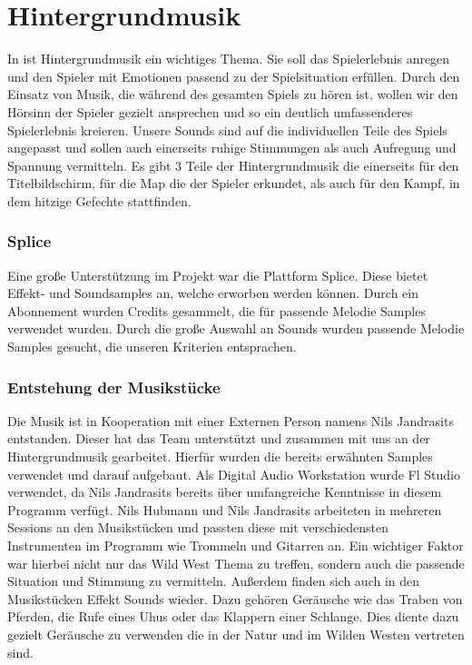 
\section{Hintergrundmusik}\label{sec:hintergrundmusik}

\renewcommand{\kapitelautor}{Autor: Nils Hubmann}

%
In \ff ist Hintergrundmusik ein wichtiges Thema. Sie soll das Spielerlebnis anregen und den Spieler mit Emotionen passend zu der Spielsituation erfüllen.
Durch den Einsatz von Musik, die während des gesamten Spiels zu hören ist, wollen wir den Hörsinn der Spieler gezielt ansprechen und so ein deutlich umfassenderes Spielerlebnis kreieren.
Unsere Sounds sind auf die individuellen Teile des Spiels angepasst und sollen auch einerseits ruhige Stimmungen als auch Aufregung und Spannung vermitteln.
Es gibt 3 Teile der Hintergrundmusik die einerseits für den Titelbildschirm, für die Map die der Spieler erkundet, als auch für den Kampf, in dem hitzige Gefechte stattfinden.

\subsubsection{Splice}\label{subsubsec:Splice}
Eine große Unterstützung im Projekt war die Plattform Splice. Diese bietet Effekt- und Soundsamples an, welche erworben werden können. Durch ein Abonnement wurden Credits gesammelt, die für passende Melodie Samples verwendet wurden.
Durch die große Auswahl an Sounds wurden passende Melodie Samples gesucht, die unseren Kriterien entsprachen.

\subsubsection{Entstehung der Musikstücke}\label{subsubsec:Musik-Enstehung}
Die Musik ist in Kooperation mit einer Externen Person namens Nils Jandrasits entstanden. Dieser hat das Team unterstützt und zusammen mit uns an der Hintergrundmusik gearbeitet.
Hierfür wurden die bereits erwähnten Samples verwendet und darauf aufgebaut. Als Digital Audio Workstation wurde Fl Studio verwendet, da Nils Jandrasits bereits über umfangreiche Kenntnisse in diesem Programm verfügt.
Nils Hubmann und Nils Jandrasits arbeiteten in mehreren Sessions an den Musikstücken und passten diese mit verschiedensten Instrumenten im Programm wie Trommeln und Gitarren an.
Ein wichtiger Faktor war hierbei nicht nur das Wild West Thema zu treffen, sondern auch die passende Situation und Stimmung zu vermitteln. Außerdem finden sich auch in den Musikstücken Effekt Sounds wieder.
Dazu gehören Geräusche wie das Traben von Pferden, die Rufe eines Uhus oder das Klappern einer Schlange.
Dies diente dazu gezielt Geräusche zu verwenden die in der Natur und im Wilden Westen vertreten sind.

